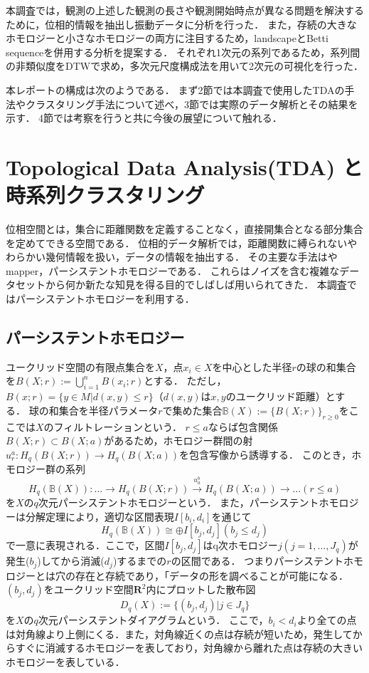 \documentclass{jarticle}
\begin{document}
本調査では，観測の上述した観測の長さや観測開始時点が異なる問題を解決するために，位相的情報を抽出し振動データに分析を行った．
また，存続の大きなホモロジーと小さなホモロジーの両方に注目するため，landscapeとBetti sequenceを併用する分析を提案する．
それぞれ1次元の系列であるため，系列間の非類似度をDTWで求め，多次元尺度構成法を用いて2次元の可視化を行った．


本レポートの構成は次のようである．
まず2節では本調査で使用したTDAの手法やクラスタリング手法について述べ，3節では実際のデータ解析とその結果を示す．
4節では考察を行うと共に今後の展望について触れる．

\section{Topological Data Analysis(TDA) と時系列クラスタリング}
位相空間とは，集合に距離関数を定義することなく，直接開集合となる部分集合を定めてできる空間である．
位相的データ解析では，距離関数に縛られないやわらかい幾何情報を扱い，データの情報を抽出する．
その主要な手法はやmapper\cite{Singh2007}，パーシステントホモロジー\cite{Edelsbrunner2002}である．
これらはノイズを含む複雑なデータセットから何か新たな知見を得る目的でしばしば用いられてきた．
本調査ではパーシステントホモロジーを利用する．

\subsection{パーシステントホモロジー}
ユークリッド空間の有限点集合を$X$，点$x_i \in X$を中心とした半径$r$の球の和集合を$B(X;r):=\bigcup_{i=1}^n B(x_i;r)$とする．
ただし，$B(x;r) =\{y \in M | d(x,y) \leq r\}$（$d(x,y)$は$x,y$のユークリッド距離）とする．
球の和集合を半径パラメータ$r$で集めた集合$\mathbb B(X):=\{B(X;r)\}_{r\geq 0}$をここでは$X$のフィルトレーションという．
$r\leq a$ならば包含関係$B(X;r)\subset B(X;a)$があるため，ホモロジー群間の射$u_r^a : H_q(B(X;r))\rightarrow H_q(B(X;a)) $を包含写像から誘導する．
このとき，ホモロジー群の系列
$$
H_q(\mathbb B(X)):\dots\rightarrow H_q(B(X;r))\overset{u_a^b}{\rightarrow} H_q(B(X;a))\rightarrow\dots (r\leq a)
$$
を$X$の$q$次元パーシステントホモロジーという．
また，パーシステントホモロジーは分解定理\cite{Zomorodian2005}により，適切な区間表現$I[b_i, d_i] $を通じて
$$
H_q(\mathbb B(X))\cong\oplus I[b_j,d_j] (b_j\leq d_j)
$$
で一意に表現される．ここで，区間$I[b_j,d_j]$はq次ホモロジー$j(j=1,\dots,J_q)$が発生($b_j$)してから消滅($d_j$)するまでの$r$の区間である．
つまりパーシステントホモロジーとは穴の存在と存続であり，「データの形を調べることが可能になる．
$(b_j, d_j)$をユークリッド空間$\mathbf R^2$内にプロットした散布図
$$
D_q(X):= \{(b_j,d_j) | j \in J_q\}
$$
を$X$の$q$次元パーシステントダイアグラムという．
ここで，$b_i <  d_i$より全ての点は対角線より上側にくる．また，対角線近くの点は存続が短いため，発生してからすぐに消滅するホモロジーを表しており，対角線から離れた点は存続の大きいホモロジーを表している．
\end{document}
